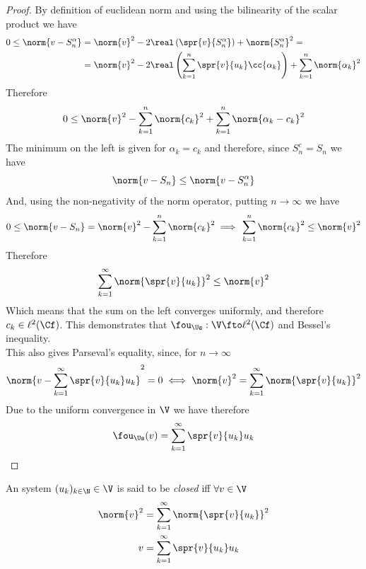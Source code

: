\documentclass[../mmf.tex]{subfiles}
\begin{document}
\begin{proof}
	By definition of euclidean norm and using the bilinearity of the scalar product we have
	\begin{equation*}
		\begin{aligned}
			0\le\norm{v-S_n^\alpha}&=\norm{v}^2-2\real\left( \spr{v}{S_n^\alpha} \right)+\norm{S_n^\alpha}^2=\\
			&=\norm{v}^2-2\real\left( \sum_{k=1}^n\spr{v}{u_k}\cc{\alpha_k} \right)+\sum_{k=1}^{n}\norm{\alpha_k}^2\\
		\end{aligned}
	\end{equation*}
	Therefore
	\begin{equation*}
		0\le\norm{v}^2-\sum_{k=1}^{n}\norm{c_k}^2+\sum_{k=1}^n\norm{\alpha_k-c_k}^2
	\end{equation*}
	The minimum on the left is given for $\alpha_k=c_k$ and therefore, since $S_n^c=S_n$ we have
	\begin{equation*}
		\norm{v-S_n}\le\norm{v-S_n^\alpha}
	\end{equation*}
	And, using the non-negativity of the norm operator, putting $n\to\infty$ we have
	\begin{equation*}
		0\le\norm{v-S_n}=\norm{v}^2-\sum_{k=1}^n\norm{c_k}^2\implies{}\sum_{k=1}^{n}\norm{c_k}^2\le\norm{v}^2
	\end{equation*}
	Therefore
	\begin{equation*}
		\sum_{k=1}^{\infty}\norm{\spr{v}{u_k}}^2\le\norm{v}^2
	\end{equation*}
	Which means that the sum on the left converges uniformly, and therefore $c_k\in\ell^2(\Cf)$. This demonstrates that $\fou_{\Us}:\V\fto\ell^2(\Cf)$ and Bessel's inequality.\\
	This also gives Parseval's equality, since, for $n\to\infty$
	\begin{equation*}
		\norm{v-\sum_{k=1}^{\infty}\spr{v}{u_k}u_k}^2=0\iff{}\norm{v}^2=\sum_{k=1}^{\infty}\norm{\spr{v}{u_k}}^2
	\end{equation*}
	Due to the uniform convergence in $\V$ we have therefore
	\begin{equation*}
		\fou_{\Us}(v)=\sum_{k=1}^\infty\spr{v}{u_k}u_k
	\end{equation*}
\end{proof}
\begin{dfn}
	An system $(u_k)_{k\in\N}\in\V$ is said to be \textit{closed} iff $\forall v\in\V$
	\begin{equation*}
		\begin{aligned}
			\norm{v}^2&=\sum_{k=1}^{\infty}\norm{\spr{v}{u_k}}^2\\
			v&=\sum_{k=1}^{\infty}\spr{v}{u_k}u_k
		\end{aligned}
	\end{equation*}
\end{dfn}
\end{document}
